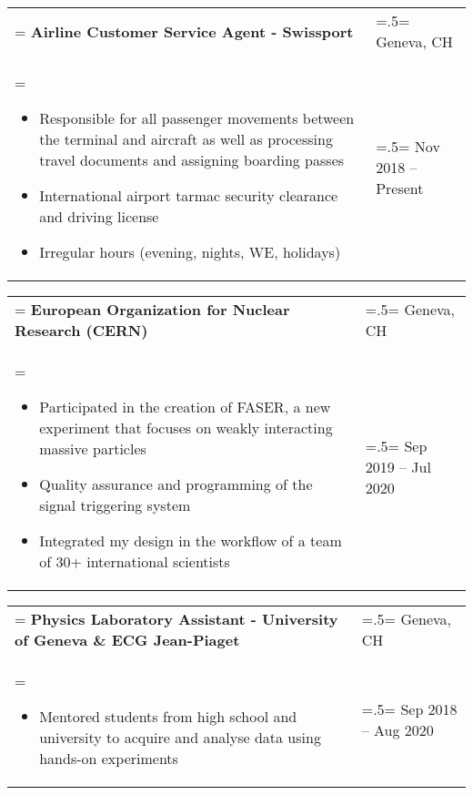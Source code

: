 \documentclass[letterpaper, 11pt]{article}
\begin{document}
\begin{tabularx}{1.0\textwidth} { 
   >{\raggedright\arraybackslash\hsize=1.5\hsize\linewidth=\hsize}X 
   >{\raggedleft\arraybackslash\hsize=.5\hsize\linewidth=\hsize}X }
\normalsize
\bf{Airline Customer Service Agent - Swissport} & Geneva, CH\\
\normalfont \begin{itemize}[leftmargin=*,noitemsep,topsep=0pt]
\item Responsible for all passenger movements between the terminal and aircraft as well as processing travel documents and assigning boarding passes
\item International airport tarmac security clearance and driving license
\item Irregular hours (evening, nights, WE, holidays)
\end{itemize} & Nov 2018 -- Present
\end{tabularx}

\begin{tabularx}{1.0\textwidth} { 
   >{\raggedright\arraybackslash\hsize=1.5\hsize\linewidth=\hsize}X 
   >{\raggedleft\arraybackslash\hsize=.5\hsize\linewidth=\hsize}X }
\normalsize
\bf{European Organization for Nuclear Research (CERN)} & Geneva, CH\\
\normalfont \begin{itemize}[leftmargin=*,noitemsep,topsep=0pt]
\item Participated in the creation of FASER, a new experiment that focuses on weakly interacting massive particles
\item Quality assurance and programming of the signal triggering system
\item Integrated my design in the workflow of a team of 30+ international scientists
\end{itemize} & Sep 2019 -- Jul 2020
\end{tabularx}

\begin{tabularx}{1.0\textwidth} { 
   >{\raggedright\arraybackslash\hsize=1.5\hsize\linewidth=\hsize}X 
   >{\raggedleft\arraybackslash\hsize=.5\hsize\linewidth=\hsize}X }
\normalsize
\bf{Physics Laboratory Assistant - University of Geneva \& ECG Jean-Piaget} & Geneva, CH\\
\normalfont \begin{itemize}[leftmargin=*,noitemsep,topsep=0pt]
\item Mentored students from high school and university to acquire and analyse data using hands-on experiments
\end{itemize} & Sep 2018 -- Aug 2020
\end{tabularx}
\end{document}
